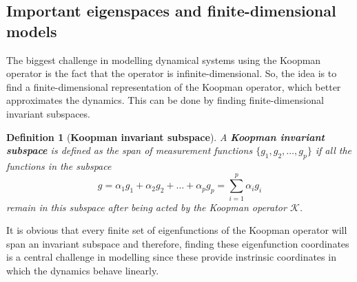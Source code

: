 \documentclass[]{article}
\newtheorem{definition}{Definition}
\begin{document}
\subsection{Important eigenspaces and finite-dimensional models}
The biggest challenge in modelling dynamical systems using the Koopman operator is the fact that the operator is infinite-dimensional. So, the idea is to find a finite-dimensional representation of the Koopman operator, which better approximates the dynamics. This can be done by finding finite-dimensional invariant subspaces.
\begin{definition}[\textbf{Koopman invariant subspace}] 
A \textbf{Koopman invariant subspace} is defined as the span of measurement functions $\{g_1,g_2,\dots,g_p\}$ if all the functions in the subspace 
\begin{equation}
	g = \alpha_1g_1+\alpha_2g_2+\dots+\alpha_pg_p = \sum_{i=1}^p \alpha_i g_i
\end{equation}
remain in this subspace after being acted by the Koopman operator $\mathcal{K}$.
\end{definition}
It is obvious that every finite set of eigenfunctions of the Koopman operator will span an invariant subspace and therefore, finding these eigenfunction coordinates is a central challenge in modelling since these provide instrinsic coordinates in which the dynamics behave linearly.
\end{document}
